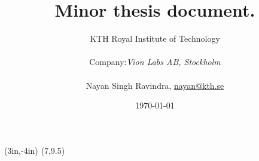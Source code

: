\documentclass[12pt]{article}
\title{Minor thesis document. \\ }
\author{ KTH Royal Institute of Technology\\\\
         Company:{\it  Vion Labs AB, Stockholm} 
	\\\\Nayan Singh Ravindra, \hyperlink{mailto:nayan@kth.se}{nayan@kth.se}}
\date{\today}
\begin{document}
	\thisfancyput(3in,-4in){%
		\setlength{\unitlength}{1in}\fancyoval(7,9.5)}%
	
	\maketitle
	\pagebreak
	\tableofcontents
	
	
	\printglossaries
	\printbibliography	
	
\end{document}

